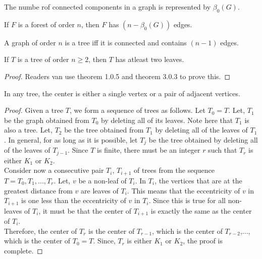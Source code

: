 \begin{defn}
    The numbe rof connected components in a graph is represented by $\beta_{0}(G)$.
\end{defn}

\begin{thm}
    If $F$ is a forest of order $n$, then $F$ has $(n-\beta_{0}(G))$ edges.
\end{thm}

\begin{thm}
    A graph of order $n$ is a tree iff it is connected and contains $(n-1)$ edges.
\end{thm}

\begin{thm}
    If $T$ is a tree of order $n \ge 2$, then $T$ has atleast two leaves.
\end{thm}
\begin{proof}
    Readers van use theorem 1.0.5 and theorem 3.0.3 to prove this.
\end{proof}

\begin{thm}
    In any tree, the center is either a single vertex or a pair of adjacent vertices.
\end{thm}
\begin{proof}
Given a tree $T$, we form a sequence of trees as follows. Let $T_0 = T$. Let, $T_1$ be the graph obtained from $T_0$ by deleting all of its leaves. Note here that $T_1$ is also a tree. Let, $T_2$ be the tree obtained from $T_1$ by deleting all of the leaves of $T_1$. In general, for as long as it is possible, let $T_j$ be the tree obtained by deleting all of the leaves of $T_{j-1}$. Since $T$ is finite, there must be an integer $r$ such that $T_r$ is either $K_1$ or $K_2$.\\
Consider now a consecutive pair $T_i$, $T_{i+1}$ of trees from the sequence $T=T_0, T_1,..., T_r$. Let, $v$ be a non-leaf of $T_i$. In $T_i$, the vertices that are at the greatest distance from $v$ are leaves of $T_i$. This means that the eccentricity of $v$ in $T_{i+1}$ is one less than the eccentricity of $v$ in $T_i$. Since this is true for all non-leaves of $T_i$, it must be that the center of $T_{i+1}$ is exactly the same as the center of $T_i$.\\
Therefore, the center of $T_r$ is the center of $T_{r-1}$, which is the center of $T_{r-2}$,..., which is the center of $T_0=T$. Since, $T_r$ is either $K_1$ or $K_2$, the proof is complete.
\end{proof}


